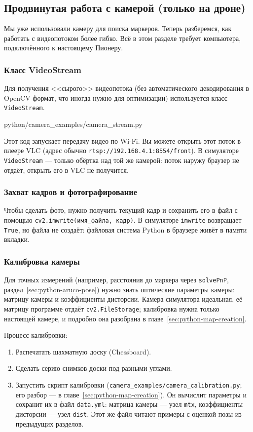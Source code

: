 \subsection{Продвинутая работа с камерой (только на дроне)}

Мы уже использовали камеру для поиска маркеров. Теперь разберемся, как работать с видеопотоком более гибко. Всё в этом разделе требует компьютера, подключённого к настоящему Пионеру.

\subsubsection*{Класс VideoStream}
Для получения <<сырого>> видеопотока (без автоматического декодирования в OpenCV формат, что иногда нужно для оптимизации) используется класс \texttt{VideoStream}.

\begin{codefile}[python]{python/camera_examples/camera_stream.py}
\end{codefile}

Этот код запускает передачу видео по Wi-Fi. Вы можете открыть этот поток в плеере VLC (адрес обычно \texttt{rtsp://192.168.4.1:8554/front}). В симуляторе \texttt{VideoStream} --- только обёртка над той же камерой: поток наружу браузер не отдаёт, открыть его в VLC не получится.

\subsubsection*{Захват кадров и фотографирование}
Чтобы сделать фото, нужно получить текущий кадр и сохранить его в файл с помощью \texttt{cv2.imwrite(имя\_файла, кадр)}. В симуляторе \texttt{imwrite} возвращает \texttt{True}, но файла не создаёт: файловая система Python в браузере живёт в памяти вкладки.

\subsubsection*{Калибровка камеры}
Для точных измерений (например, расстояния до маркера через \texttt{solvePnP}, раздел~\ref{sec:python-aruco-pose}) нужно знать оптические параметры камеры: матрицу камеры и коэффициенты дисторсии. Камера симулятора идеальная, её матрицу программе отдаёт \texttt{cv2.FileStorage}; калибровка нужна только настоящей камере, и подробно она разобрана в главе~\ref{sec:python-map-creation}.

Процесс калибровки:
\begin{enumerate}
    \item Распечатать шахматную доску (Chessboard).
    \item Сделать серию снимков доски под разными углами.
    \item Запустить скрипт калибровки (\texttt{camera\_examples/camera\_calibration.py}; его разбор --- в главе~\ref{sec:python-map-creation}). Он вычислит параметры и сохранит их в файл \texttt{data.yml}: матрица камеры --- узел \texttt{mtx}, коэффициенты дисторсии --- узел \texttt{dist}. Этот же файл читают примеры с оценкой позы из предыдущих разделов.
\end{enumerate}

